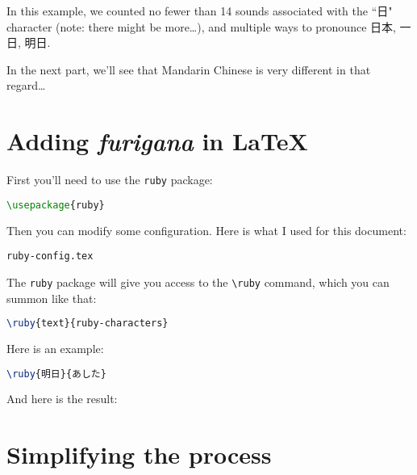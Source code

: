 In this example, we counted no fewer than 14 sounds associated with the ``日" character (note: there might be more\dots), and multiple ways to pronounce 日本, 一日, 明日. \\


\bigskip
In the next part, we'll see that Mandarin Chinese is very different in that regard\dots

\newpage

\section*{Adding \emph{furigana} in \LaTeX} \label{rubi-config}



First you'll need to use the \texttt{ruby} package:

\begin{lstlisting}[language=tex]
\usepackage{ruby}
\end{lstlisting}

\bigskip

Then you can modify some configuration. Here is what I used for this document:

\texttt{ruby-config.tex}


\bigskip

The \texttt{ruby} package will give you access to the \lstinline|\ruby| command, which you can summon like that:
\begin{lstlisting}[language=tex]
\ruby{text}{ruby-characters}
\end{lstlisting}

Here is an example: 

\begin{lstlisting}[language=tex]
\ruby{明日}{あした}
\end{lstlisting}

And here is the result: \\




\section*{Simplifying the process}


